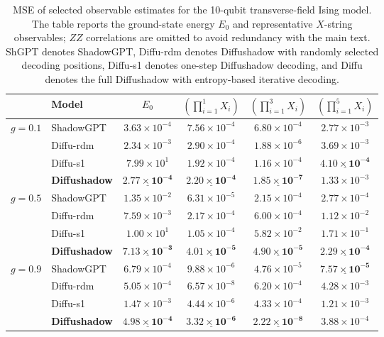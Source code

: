 \documentclass[11pt,a4paper]{article}
\begin{document}
\begin{table}[htbp]
\centering
\small
\caption{MSE of selected observable estimates for the 10-qubit transverse-field Ising model. The table reports the ground-state energy \(E_0\) and representative \(X\)-string observables; \(ZZ\) correlations are omitted to avoid redundancy with the main text. ShGPT denotes ShadowGPT, Diffu-rdm denotes Diffushadow with randomly selected decoding positions, Diffu-s1 denotes one-step Diffushadow decoding, and Diffu denotes the full Diffushadow with entropy-based iterative decoding.}
\label{tab:mse_table}
\begin{tabular}{llcccc}
\hline
 &Model & $E_0$ & $\left(\prod_{i=1}^1 X_i\right)$ & $\left(\prod_{i=1}^3 X_i\right)$ & $\left(\prod_{i=1}^5 X_i\right)$\\
\hline
\multirow{4}{*}{$g=0.1$} 
& ShadowGPT      & $3.63{\times}10^{-4}$ & $7.56{\times}10^{-4}$ & $6.80{\times}10^{-4}$ & $2.77{\times}10^{-3}$\\
& Diffu-rdm & $2.34{\times}10^{-3}$ & $2.90{\times}10^{-4}$ & $1.88{\times}10^{-6}$ & $3.69{\times}10^{-3}$\\
& Diffu-s1  & $7.99{\times}10^{1}$ & $1.92{\times}10^{-4}$ & $1.16{\times}10^{-4}$ & $\underline{\mathbf{4.10{\times}10^{-4}}}$\\
& \textbf{Diffushadow}    & $\underline{\mathbf{2.77{\times}10^{-4}}}$ & $\underline{\mathbf{2.20{\times}10^{-4}}}$ & $\underline{\mathbf{1.85{\times}10^{-7}}}$ & $1.33{\times}10^{-3}$\\
\hline
\multirow{4}{*}{$g=0.5$} 
& ShadowGPT      & $1.35{\times}10^{-2}$ & $6.31{\times}10^{-5}$ & $2.15{\times}10^{-4}$ & $2.77{\times}10^{-4}$\\
& Diffu-rdm & $7.59{\times}10^{-3}$ & $2.17{\times}10^{-4}$ & $6.00{\times}10^{-4}$ & $1.12{\times}10^{-2}$\\
& Diffu-s1  & $1.00{\times}10^{1}$ & $1.05{\times}10^{-4}$ & $5.82{\times}10^{-2}$ & $1.71{\times}10^{-1}$\\
& \textbf{Diffushadow}    & $\underline{\mathbf{7.13{\times}10^{-3}}}$ & $\underline{\mathbf{4.01{\times}10^{-5}}}$ & $\underline{\mathbf{4.90{\times}10^{-5}}}$ & $\underline{\mathbf{2.29{\times}10^{-4}}}$\\
\hline
\multirow{4}{*}{$g=0.9$} 
& ShadowGPT      & $6.79{\times}10^{-4}$ & $9.88{\times}10^{-6}$ & $4.76{\times}10^{-5}$ & $\underline{\mathbf{7.57{\times}10^{-5}}}$\\
& Diffu-rdm & $5.05{\times}10^{-4}$ & $6.57{\times}10^{-8}$ & $6.20{\times}10^{-4}$ & $4.28{\times}10^{-3}$\\
& Diffu-s1  & $1.47{\times}10^{-3}$ & $4.44{\times}10^{-6}$ & $4.33{\times}10^{-4}$ & $1.21{\times}10^{-3}$\\
& \textbf{Diffushadow}    & $\underline{\mathbf{4.98{\times}10^{-4}}}$ & $\underline{\mathbf{3.32{\times}10^{-6}}}$ & $\underline{\mathbf{2.22{\times}10^{-8}}}$ & $3.88{\times}10^{-4}$\\
\hline
\end{tabular}
\end{table}
\end{document}
